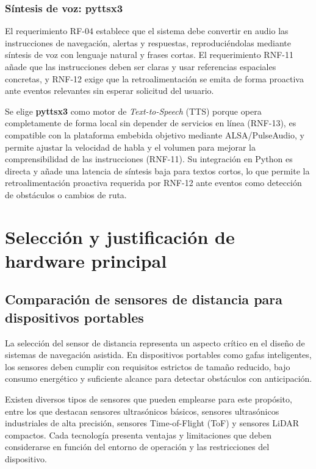 \subsubsection{Síntesis de voz: pyttsx3}

El requerimiento RF-04 establece que el sistema debe convertir en audio las
instrucciones de navegación, alertas y respuestas, reproduciéndolas mediante síntesis
de voz con lenguaje natural y frases cortas. El requerimiento RNF-11 añade que las
instrucciones deben ser claras y usar referencias espaciales concretas, y RNF-12 exige
que la retroalimentación se emita de forma proactiva ante eventos relevantes sin esperar
solicitud del usuario.

Se elige \textbf{pyttsx3} como motor de \textit{Text-to-Speech} (TTS) porque opera
completamente de forma local sin depender de servicios en línea (RNF-13), es compatible
con la plataforma embebida objetivo mediante ALSA/PulseAudio, y permite ajustar la
velocidad de habla y el volumen para mejorar la comprensibilidad de las instrucciones
(RNF-11). Su integración en Python es directa y añade una latencia de síntesis baja
para textos cortos, lo que permite la retroalimentación proactiva requerida por RNF-12
ante eventos como detección de obstáculos o cambios de ruta.

\section{Selección y justificación de hardware principal}

\subsection{Comparación de sensores de distancia para dispositivos portables}

La selección del sensor de distancia representa un aspecto crítico en el diseño de sistemas de navegación asistida. En dispositivos portables como gafas inteligentes, los sensores deben cumplir con requisitos estrictos de tamaño reducido, bajo consumo energético y suficiente alcance para detectar obstáculos con anticipación.

Existen diversos tipos de sensores que pueden emplearse para este propósito, entre los que destacan sensores ultrasónicos básicos, sensores ultrasónicos industriales de alta precisión, sensores Time-of-Flight (ToF) y sensores LiDAR compactos. Cada tecnología presenta ventajas y limitaciones que deben considerarse en función del entorno de operación y las restricciones del dispositivo.

